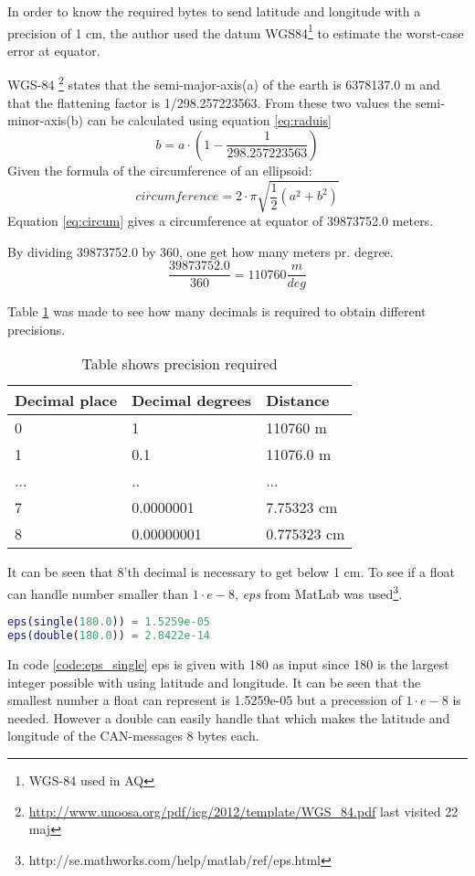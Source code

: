 In order to know the required bytes to send latitude and longitude with a precision of 1 cm, the author used the datum WGS84\footnote{WGS-84 used in AQ} to estimate the worst-case error at equator. 

WGS-84 \footnote{\url{http://www.unoosa.org/pdf/icg/2012/template/WGS_84.pdf} last visited 22 maj} states that the semi-major-axis(a) of the earth is 6378137.0 m and that the flattening factor is 1/298.257223563. From these two values the semi-minor-axis(b) can be calculated using equation \ref{eq:raduis}
\begin{equation}
b=a \cdot (1-\frac{1}{298.257223563})
\end{equation} \label{eq:raduis}
Given the formula of the circumference of an ellipsoid:
\begin{equation}
circumference = 2 \cdot \pi \sqrt{ \frac{1}{2}(a^2+b^2)}
\end{equation} \label{eq:circum}
Equation \ref{eq:circum} gives a circumference at equator of 39873752.0 meters.

By dividing 39873752.0 by 360, one get how many meters pr. degree.
\begin{equation}
\frac{39873752.0}{360} = 110760 \frac{m}{deg}
\end{equation}

Table \ref{tab:precision_latlon} was made to see how many decimals is required to obtain different precisions.
\begin{table}[H]
\centering
\caption{Table shows precision required}
\label{tab:precision_latlon}
\begin{tabular}{@{}|l|l|l|@{}}
\toprule
Decimal place & Decimal degrees & Distance    \\ \midrule
0             & 1               & 110760 m    \\ \midrule
1             & 0.1             & 11076.0 m   \\ \midrule
...           & ..              & ...         \\ \midrule
7             & 0.0000001       & 7.75323 cm  \\ \midrule
8             & 0.00000001      & 0.775323 cm \\ \bottomrule
\end{tabular}
\end{table}

It can be seen that 8'th decimal is necessary to get below 1 cm. 
To see if a float can handle number smaller than $1\cdot e-8$, \textit{eps} from MatLab was used\footnote{http://se.mathworks.com/help/matlab/ref/eps.html}.
\begin{lstlisting}[language = matlab, caption = Check if float is precise enough of a double has to be used, label=code:eps_single]
eps(single(180.0)) = 1.5259e-05
eps(double(180.0)) = 2.8422e-14
\end{lstlisting}
In code \ref{code:eps_single} eps is given with 180 as input since 180 is the largest integer possible with using latitude and longitude.
It can be seen that the smallest number a float can represent is 1.5259e-05 but a precession of $1\cdot e-8$ is needed.
However a double can easily handle that which makes the latitude and longitude of the CAN-messages 8 bytes each. \\

